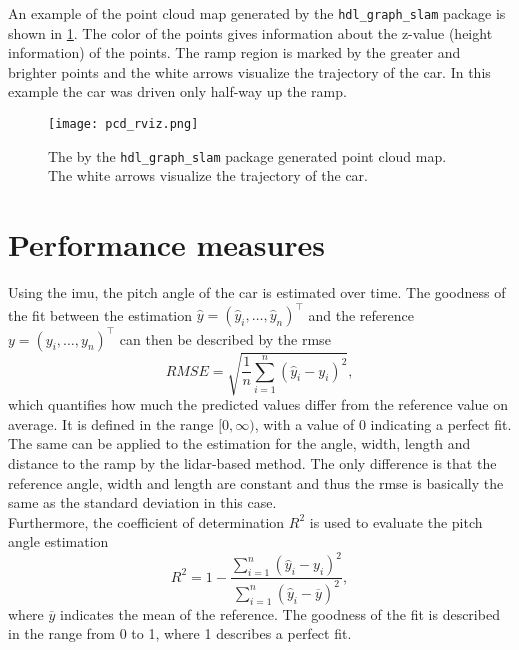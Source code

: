 An example of the point cloud map generated by the \texttt{hdl\_graph\_slam} package is shown in \cref{fig:pcd_rviz}.
The color of the points gives information about the z-value (height information) of the points.
The ramp region is marked by the greater and brighter points and the white arrows visualize the trajectory of the car.
In this example the car was driven only half-way up the ramp.
\begin{figure}[htbp]
	\centering
	\texttt{[image: pcd\_rviz.png]}
	\caption[Generated point cloud]{The by the \texttt{hdl\_graph\_slam} package generated point cloud map. The white arrows visualize the trajectory of the car.}
	\label{fig:pcd_rviz}
\end{figure}



\section{Performance measures}
Using the \gls{imu}, the pitch angle of the car is estimated over time.
The goodness of the fit between the estimation $\hat{y} = (\hat{y}_i, \dots, \hat{y}_n)^\intercal$ and the reference $y = (y_i, \dots, y_n)^\intercal$ can then be described by the \gls{rmse}
\begin{equation}
	RMSE = \sqrt{\frac{1}{n}\sum_{i = 1}^n(\hat{y}_i - y_i)^2},
\end{equation}
which quantifies how much the predicted values differ from the reference value on average.
It is defined in the range $[0, \infty)$, with a value of 0 indicating a perfect fit.
The same can be applied to the estimation for the angle, width, length and distance to the ramp by the \gls{lidar}-based method.
The only difference is that the reference angle, width and length are constant and thus the \gls{rmse} is basically the same as the standard deviation in this case.\\
Furthermore, the coefficient of determination $R^2$ is used to evaluate the pitch angle estimation
\begin{equation}
	R^2 = 1 - \frac{\sum\limits_{i = 1}^n(\hat{y}_i - y_i)^2}{\sum\limits_{i = 1}^n(\hat{y}_i - \overline{y})^2},
\end{equation}
where $\overline{y}$ indicates the mean of the reference.
The goodness of the fit is described in the range from 0 to 1, where 1 describes a perfect fit.



\section{}

